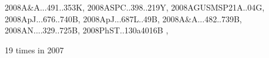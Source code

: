 \documentclass[12pt]{article}
\begin{document}
\begin{description}
{2008A&A...491..353K,%
2008ASPC..398..219Y,%
2008AGUSMSP21A..04G,%
2008ApJ...676..740B,%
2008ApJ...687L..49B,%
2008A&A...482..739B,%
2008AN....329..725B,%
2008PhST..130a4016B%
},\item
19 times in 2007 \citep{
2007AN....328.1006K,%
2007A&A...476.1123F,%
2007A&A...476.1113F,%
2007ApJ...670..805O,%
2007ApJ...669.1390H,%
2007NJPh....9..305B,%
2007NJPh....9..300S,%
2007IAUS..237..183G,%
2007MNRAS.378..662R,%
2007ApJ...662..627J,%
2007ApJ...662..613Y,%
2007Natur.448.1022J,%
2007arXiv0708.3893J,%
2007MNRAS.376.1238S,%
2007AN....328..507B,%
}
\end{description}
\end{document}
